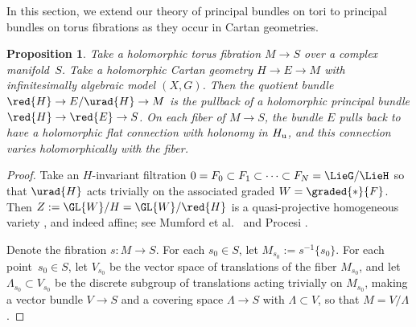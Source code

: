 \documentclass[pdftex]{sigma}
\numberwithin{equation}{section}
\newtheorem{Proposition}[Theorem]{Proposition}
\begin{document}
In this section, we extend our theory of principal bundles on tori to principal bundles on torus fibrations as they occur in Cartan geometries.
\begin{Proposition}\label{proposition:torus.fibration}
Take a holomorphic torus fibration $M \to S$ over a complex manifold~$S$.
Take a holomorphic Cartan geometry $H \to E \to M$ with infinitesimally algebraic model $(X, G)$.
Then the quotient bundle $\red{H}\to E/\urad{H} \to M$ is the pullback of a holomorphic principal bundle $\red{H} \to \red{E} \to S$.
On each fiber of $M \to S$, the bundle $E$ pulls back to have a holomorphic flat connection with holonomy in $H_{\rm u}$, and this connection varies holomorphically with the fiber.
\end{Proposition}

\begin{proof}
Take an $H$-invariant filtration $0 = F_0 \subset F_1 \subset \dots \subset F_N = \LieG/\LieH$ so
that $\urad{H}$ acts trivially on the associated graded $W=\graded{*}{F}$.
Then $Z := \GL{W}/H = \GL{W}/\red{H}$ is a quasi-projective homogeneous variety
\cite[Theorem 12.2.1]{Springer:2009}, and indeed affine; see Mumford et al.\
\cite[Theorem~1.1]{Mumford/Fogarty/Kirwan:1994} and Procesi \cite[Theorem 2]{Procesi:2007}.

Denote the fibration $s \colon M \to S$.
For each $s_0 \in S$, let $M_{s_0} := s^{-1}\{s_0\}$.
For each point~${s_0 \in S}$, let $V_{s_0}$ be the vector space of translations of the fiber $M_{s_0}$, and let $\Lambda_{s_0}
 \subset V_{s_0}$ be the discrete subgroup of translations acting trivially on $M_{s_0}$, making a vector bundle $V \to S$ and a covering space $\Lambda \to S$ with $\Lambda \subset V$, so that $M=V/\Lambda$.


\end{proof}
\end{document}

